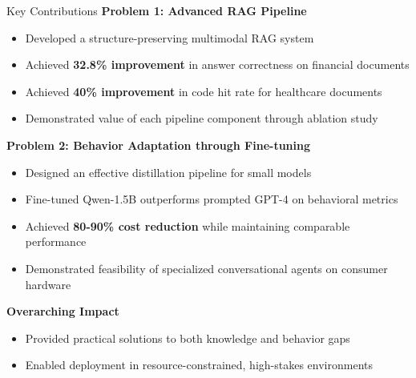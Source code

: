 \documentclass[11pt, aspectratio=169, xcolor=table]{beamer}
\begin{document}
\begin{frame}{Key Contributions}
    \textbf{\color{MainNavy}Problem 1: Advanced RAG Pipeline}
    \begin{itemize}
        \item Developed a structure-preserving multimodal RAG system
        \item Achieved \textbf{32.8\% improvement} in answer correctness on financial documents
        \item Achieved \textbf{40\% improvement} in code hit rate for healthcare documents
        \item Demonstrated value of each pipeline component through ablation study
    \end{itemize}
    
    \vspace{0.3cm}
    \textbf{\color{MainNavy}Problem 2: Behavior Adaptation through Fine-tuning}
    \begin{itemize}
        \item Designed an effective distillation pipeline for small models
        \item Fine-tuned Qwen-1.5B outperforms prompted GPT-4 on behavioral metrics
        \item Achieved \textbf{80-90\% cost reduction} while maintaining comparable performance
        \item Demonstrated feasibility of specialized conversational agents on consumer hardware
    \end{itemize}
    
    \vspace{0.3cm}
    \textbf{\color{MainNavy}Overarching Impact}
    \begin{itemize}
        \item Provided practical solutions to both knowledge and behavior gaps
        \item Enabled deployment in resource-constrained, high-stakes environments
    \end{itemize}
\end{frame}
\end{document}
